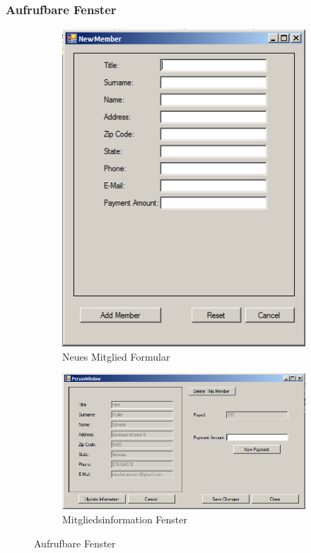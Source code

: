 \documentclass{article}
\begin{document}
\subsubsection{Aufrufbare Fenster}
 \begin{figure}[h]
 	\centering
 	\begin{subfigure}{.4\textwidth}
 		\centering
 		\includegraphics[width=.5\linewidth]{NewMemberGui}
 		\caption{Neues Mitglied Formular}
 		\label{fig:sub1}
 	\end{subfigure}%
 	\begin{subfigure}{.5\textwidth}
 		\centering
 		\includegraphics[width=.8\linewidth]{MemberInfoGUI}
 		\caption{Mitgliedsinformation Fenster}
 		\label{fig:sub2}
 	\end{subfigure}
 	\caption{Aufrufbare Fenster}
 	\label{fig:test}
 \end{figure}
\end{document}
